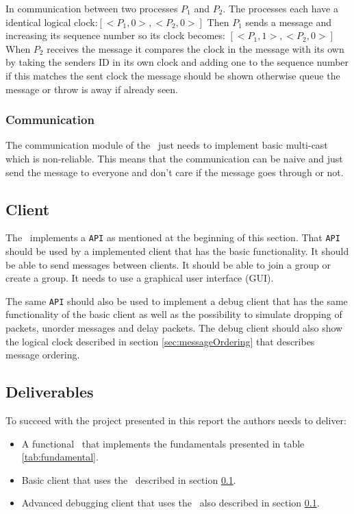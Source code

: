 \begin{example}
In communication between two processes $P_1$ and $P_2$. The processes each have a identical logical clock:\newline $[<P_1, 0>, <P_2,0>]$\newline 
Then $P_1$ sends a message and increasing its sequence number so its clock becomes: \newline $[<P_1,1>,<P_2,0>]$\newline
When $P_2$ receives the message it compares the clock in the message with its own by taking the senders ID in its own clock and adding one to the sequence number if this matches the sent clock the message should be shown otherwise queue the message or throw is away if already seen.
\label{ex:1}
\end{example}

\subsubsection{Communication}
The communication module of the \mw\ just needs to implement basic multi-cast which is non-reliable. This means that the communication can be naive and just send the message to everyone and don't care if the message goes through or not.

\subsection{Client}\label{sec:client}
The \mw\ implements a \texttt{API} as mentioned at the beginning of this section. That \texttt{API} should be used by a implemented 
client that has the basic functionality. It should be able to send messages between clients. It should be able to join a group or create a group. It needs to use a graphical user interface (GUI).

The same \texttt{API} should also be used to implement a debug client that has the same functionality of the basic client as well as the possibility to simulate dropping of packets, unorder messages and delay packets. The debug client should also show the logical clock described in section \ref{sec:messageOrdering} that describes message ordering.



\subsection{Deliverables}
To succeed with the project presented in this report the authors needs to deliver:

\begin{itemize}
	\item A functional \mw\ that implements the fundamentals presented in table \ref{tab:fundamental}.
	\item Basic client that uses the \mw\ described in section \ref{sec:client}.
	\item Advanced debugging client that uses the \mw\ also described in section \ref{sec:client}.
\end{itemize}